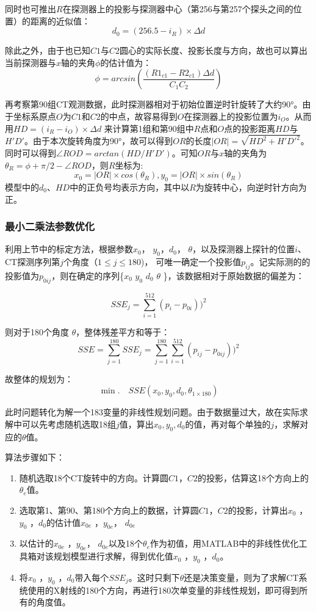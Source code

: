 \documentclass{myart}
\begin{document}
同时也可推出\(R\)在探测器上的投影与探测器中心（第256与第257个探头之间的位置）的距离的近似值：
\[d_0 = (256.5 - i_R) \times \Delta d\]

除此之外，由于也已知\(C1\)与\(C2\)圆心的实际长度、投影长度与方向，故也可以算出当前探测器与\(x\)轴的夹角\(\phi\)的估计值为：
\[ \phi = arcsin\left(  \frac{(R1_{c1} - R2_{c1})\Delta d}{C_1 C_2}   \right)\]

再考察第90组CT观测数据，此时探测器相对于初始位置逆时针旋转了大约90°。由于坐标系原点\(O\)为\(C1\)和\(C2\)的中点，故容易得到\(O\)在探测器上的投影位置为\(i_O\)。从而用\(HD= (i_R - i_O) \times \Delta d\) 来计算第1组和第90组中\(R\)点和\(O\)点的投影距离\(HD\)与\(H'D'\)。由于本次旋转角度为90°，故可以得到\(OR\)的长度\(|OR| = \sqrt{HD^2 + H'D'^2}\)。同时可以得到\(\angle ROD = arctan(HD/H'D') \)。可知\(OR\)与\(x\)轴的夹角为 \( \theta _R = \phi + \pi/2 - \angle ROD \)，则\(R\)坐标为:
\[x_0 = |OR| \times cos(\theta_R), y_0 = |OR| \times sin(\theta_R) \]
    模型中的\(d_0\)、\(HD\)中的正负号均表示方向，其中以\(R\)为旋转中心，向逆时针方向为正。

\subsubsection{最小二乘法参数优化}

利用上节中的标定方法，根据参数\( x_0 \)， \(y_0\)，\( d_0 \)， \(\theta\)，以及探测器上探针的位置\(i\)、CT探测序列第\(j\)个角度（\(1\leq j \leq 180\))，  可唯一确定一个投影值\(p_{ij}\)。记实际测的的投影值为\(p_{0ij}\)，则在确定的序列\{\( x_0 \) \(y_0\) \( d_0 \)  \(\theta\) \}，该数据相对于原始数据的偏差为：

\[SSE_j = \sum_{i = 1}^{512} (p_i - p_{0i}))^2 \]

则对于180个角度 \(\theta\)，整体残差平方和等于：
\[SSE = \sum_{j=1}^{180} SSE_j = \sum_{j=1}^{180}\sum_{i = 1}^{512} (p_{ij} - p_{0ij}))^2 \]

故整体的规划为：
\[ \min. \quad SSE(x_0, y_0, d_0, \theta_{1\times180} ) \]

此时问题转化为解一个183变量的非线性规划问题。由于数据量过大，故在实际求解中可以先考虑随机选取18组\(j\)值，算出\(x_0, y_0, d_0\)的值，再对每个单独的\(j\)，求解对应的\(\theta\)值。

算法步骤如下：
\begin{enumerate}
  \item 随机选取18个CT旋转中的方向。计算圆\(C1\)，\(C2\)的投影，估算这18个方向上的\(\theta_e\)值。
  \item 选取第1、第90、第180个方向上的数据，计算圆\(C1\)，\(C2\)的投影，计算出\( x_0 \) ，\(y_0\) ，\( d_0 \)的估计值\( x_{0e} \) ，\(y_{0e}\)， \( d_{0e} \)
  \item 以估计的\( x_{0e} \) ，\(y_{0e}\)， \( d_{0e} \)以及18个\(\theta_e\)作为初值，用MATLAB中的非线性优化工具箱对该规划模型进行求解，得到优化值\( x_0 \) ，\(y_0\) ，\( d_0 \)。
  \item 将\( x_0 \) ，\(y_0\) ，\( d_0 \)带入每个\(SSE_j\)。这时只剩下\(\theta\)还是决策变量，则为了求解CT系统使用的X射线的180个方向，再进行180次单变量的非线性规划，即可得到所有的角度值。
\end{enumerate}
\end{document}
